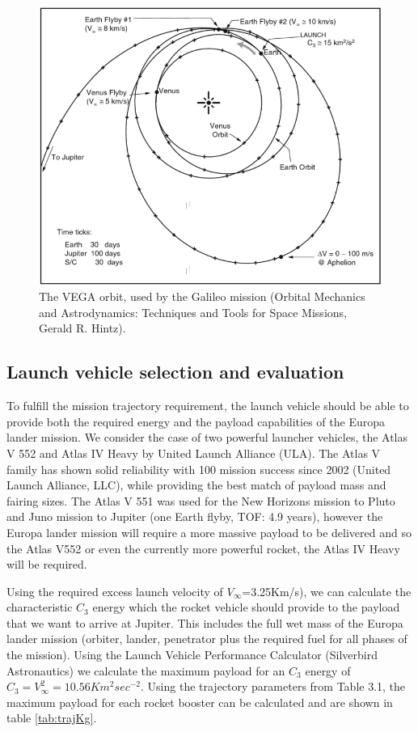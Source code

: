 \begin{figure}[htb]
\centering
\includegraphics[width=1\textwidth]{figures/Orbiter/VEEGA.png}
\caption{The  VEGA orbit, used by the Galileo mission (Orbital Mechanics and Astrodynamics: Techniques and Tools for Space Missions, Gerald R. Hintz).}
\end{figure}
\subsection{Launch vehicle selection and evaluation}
To fulfill the mission trajectory requirement, the launch vehicle should be able to provide both the required energy and the payload capabilities of the Europa lander mission. We consider the case of two powerful launcher vehicles, the Atlas V 552 and Atlas IV Heavy by United Launch Alliance (ULA). The Atlas V family has shown solid reliability with 100 mission success since 2002 (United Launch Alliance, LLC), while providing the best match of payload mass and fairing sizes. The Atlas V 551 was used for the New Horizons mission to Pluto and Juno mission to Jupiter (one Earth flyby, TOF: 4.9 years), however the Europa lander mission will require a more massive payload to be delivered and so the Atlas V552 or even the currently more powerful rocket, the Atlas IV Heavy will be required. 

Using the required excess launch velocity of  $V_{\infty}$=3.25Km/s), we can calculate the characteristic $C_3$ energy which the rocket vehicle should provide to the payload that we want to arrive at Jupiter. This includes the full wet mass of the Europa lander mission (orbiter, lander, penetrator plus the required fuel for all phases of the mission). Using the Launch Vehicle Performance Calculator (Silverbird Astronautics) 
we calculate the maximum payload for an $C_3$ energy of $C_{3}=V_{\infty}^{2}=10.56 Km^2sec^{-2}$. Using the trajectory parameters from Table 3.1, the maximum payload for each rocket booster can be calculated and are shown in table \ref{tab:trajKg}.

